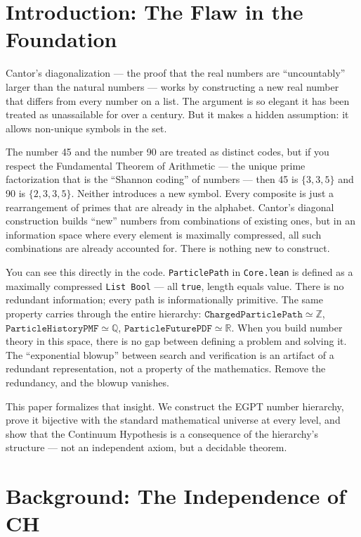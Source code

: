 \documentclass{report}
\begin{document}
\tableofcontents

\section{Introduction: The Flaw in the Foundation}

Cantor's diagonalization --- the proof that the real numbers are ``uncountably''
larger than the natural numbers --- works by constructing a new real number that
differs from every number on a list. The argument is so elegant it has been
treated as unassailable for over a century. But it makes a hidden assumption: it
allows non-unique symbols in the set.

The number 45 and the number 90 are treated as distinct codes, but if you
respect the Fundamental Theorem of Arithmetic --- the unique prime factorization
that is the ``Shannon coding'' of numbers --- then 45 is $\{3, 3, 5\}$ and 90
is $\{2, 3, 3, 5\}$. Neither introduces a new symbol. Every composite is just a
rearrangement of primes that are already in the alphabet. Cantor's diagonal
construction builds ``new'' numbers from combinations of existing ones, but in
an information space where every element is maximally compressed, all such
combinations are already accounted for. There is nothing new to construct.

You can see this directly in the code. \texttt{ParticlePath} in
\texttt{Core.lean} is defined as a maximally compressed \texttt{List Bool} ---
all \texttt{true}, length equals value. There is no redundant information; every
path is informationally primitive. The same property carries through the entire
hierarchy: $\texttt{ChargedParticlePath} \simeq \mathbb{Z}$,
$\texttt{ParticleHistoryPMF} \simeq \mathbb{Q}$,
$\texttt{ParticleFuturePDF} \simeq \mathbb{R}$. When you build number theory in
this space, there is no gap between defining a problem and solving it. The
``exponential blowup'' between search and verification is an artifact of a
redundant representation, not a property of the mathematics. Remove the
redundancy, and the blowup vanishes.

This paper formalizes that insight. We construct the EGPT number hierarchy, prove
it bijective with the standard mathematical universe at every level, and show
that the Continuum Hypothesis is a consequence of the hierarchy's structure ---
not an independent axiom, but a decidable theorem.

\section{Background: The Independence of CH}
\end{document}
